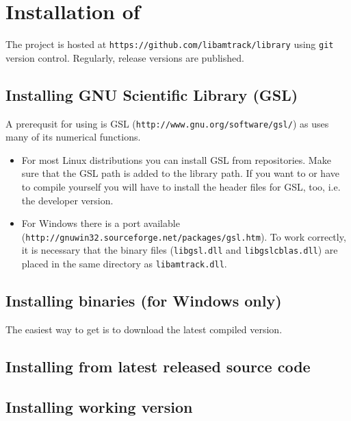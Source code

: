 
\chapter{Installation of \la{}}

The \la{} project is hosted at \texttt{https://github.com/libamtrack/library} using \texttt{git} version control. Regularly, release versions are published.

\section{Installing GNU Scientific Library (GSL)}

A prerequsit for using \la{} is GSL (\texttt{http://www.gnu.org/software/gsl/}) as \la{} uses many of its numerical functions.

\begin{itemize}
\item{For most Linux distributions you can install GSL from repositories. Make sure that the GSL path is added to the library path. If you want to or have to compile \la{} yourself you will have to install the header files for GSL, too, i.e. the developer version.}
\item{For Windows there is a port available (\texttt{http://gnuwin32.sourceforge.net/packages/gsl.htm}). To work correctly, it is necessary that the binary files (\texttt{libgsl.dll} and \texttt{libgslcblas.dll}) are placed in the same directory as \texttt{libamtrack.dll}.}
\end{itemize}

\section{Installing \la{} binaries (for Windows only)}
The easiest way to get \la{} is to download the latest compiled version.

\section{Installing \la{} from latest released source code}

\section{Installing \la{} working version}

